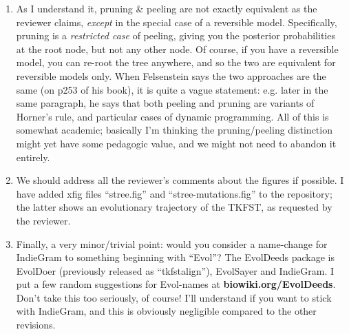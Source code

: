 {\begin{enumerate}
From this it is possible to make a crude MCMC sampler, just by proposing/accepting/rejecting alignment/tree/structure changes.
An {\em efficient} MCMC sampler needs to be able to make local topology changes and to resample the multiple alignment around a topology change;
we can do this too, in principle, but it's beyond this paper.
%
\item As I understand it, pruning \& peeling are not exactly equivalent as the reviewer claims, {\em except} in the special case of a reversible model.
Specifically, pruning is a {\em restricted case} of peeling, giving you the posterior probabilities at the root node, but not any other node.
Of course, if you have a reversible model, you can re-root the tree anywhere, and so the two are equivalent for reversible models only.
When Felsenstein says the two approaches are the same (on p253 of his book), it is quite a vague statement:
e.g. later in the same paragraph, he says that both peeling and pruning are variants of Horner's rule, and particular cases of dynamic programming.
All of this is somewhat academic; basically I'm thinking the pruning/peeling distinction might yet have some pedagogic value, and we might not need to abandon it entirely.
%
\item We should address all the reviewer's comments about the figures if possible.
I have added xfig files ``stree.fig'' and ``stree-mutations.fig'' to the repository; the latter shows an evolutionary trajectory of the TKFST, as requested by the reviewer.
%
\item Finally, a very minor/trivial point: would you consider a name-change for IndieGram to something beginning with ``Evol''?
The EvolDeeds package is EvolDoer (previously released as ``tkfstalign''), EvolSayer and IndieGram.
I put a few random suggestions for Evol-names at {\bf biowiki.org/EvolDeeds}.
Don't take this too seriously, of course!
I'll understand if you want to stick with IndieGram, and this is obviously negligible compared to the other revisions.
%
\end{enumerate}
\hrulefill{}}

